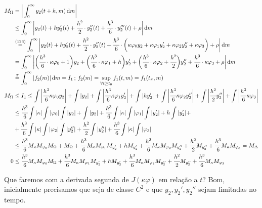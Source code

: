 \documentclass[12pt]{article}
\begin{document}
\begin{align}
M_{\Omega} &= \bigg| \int_0^{\infty} y_2(t + h, m)\,\mathrm{d}m \bigg| \\
&\le \int_0^{\infty} \bigg| y_2(t) + h y_2'(t) + \cfrac{h^2}{2}\cdot y_2''(t) + \cfrac{h^3}{6}\cdot y_2'''(t) + \rho \bigg| \,\mathrm{d}m \\
&\stackrel{(126)}{=} \int_0^{\infty} \bigg| y_2(t) + h y_2'(t) + \cfrac{h^2}{2}\cdot y_2''(t) + \cfrac{h^3}{6}\cdot \bigg( \kappa \varphi_0 y_2 + \kappa \varphi_1 y'_2 + \kappa \varphi_2 y_2'' + \kappa \varphi_3 \bigg) + \rho \bigg| \,\mathrm{d}m \\
&= \int_0^{\infty} \bigg| \bigg(\cfrac{h^3}{6}\cdot \kappa \varphi_0 + 1 \bigg) y_2 + \bigg(\cfrac{h^3}{6}\cdot \kappa \varphi_1  + h \bigg) y'_2 + \bigg( \cfrac{h^3}{6}\cdot \kappa \varphi_2 + \cfrac{h^2}{2} \bigg) y_2'' + \cfrac{h^3}{6}\cdot \kappa \varphi_3 + \rho \bigg| \,\mathrm{d}m \\
&\stackrel{\pi}{=} \int_0^{\infty} | f_2(m) | \,\mathrm{d}m = I_1\,;\,f_2(m) = \sup_{\forall t \ge t_0} f_1(t, m) = f_1(t_{\pi}, m) \\
M_{\Omega} &\le I_1 \le \int \bigg| \cfrac{h^3}{6} \kappa \varphi_0 y_2 \bigg| + \int | y_2 | + \int \bigg| \cfrac{h^3}{6} \kappa \varphi_1 y_2' \bigg| + \int | h y_2' | + \int \bigg| \cfrac{h^3}{6} \kappa \varphi_2 y_2'' \bigg| + \int \bigg| \cfrac{h^2}{2} y_2'' \bigg| + \int \bigg|  \cfrac{h^3}{6} \kappa \varphi_3 \bigg|  \\
&\le \cfrac{h^3}{6} \int | \kappa | \int |\varphi_0| \int |y_2 | + \int | y_2 | + \cfrac{h^3}{6} \int | \kappa| \int | \varphi_1 | \int | y_2' | + h \int | y_2' | + \nonumber \\
&+ \cfrac{h^3}{6} \int | \kappa| \int | \varphi_2 | \int | y_2'' |+ \cfrac{h^2}{2} \int | y_2'' | + \cfrac{h^3}{6} \int | \kappa| \int | \varphi_3 |  \\
&\le \cfrac{h^3}{6} M_{\kappa} M_{\varphi_0} M_{\Omega} + M_{\Omega} + \cfrac{h^3}{6} M_{\kappa} M_{\varphi_1} M_{y_2'} + h M_{y_2'} +  \cfrac{h^3}{6} M_{\kappa} M_{\varphi_2} M_{y_2''} + \cfrac{h^2}{2} M_{y_2''} + \cfrac{h^3}{6} M_{\kappa} M_{\varphi_3} = M_{\Delta}  \\
0 &\le \cfrac{h^3}{6} M_{\kappa} M_{\varphi_0} M_{\Omega} + \cfrac{h^3}{6} M_{\kappa} M_{\varphi_1} M_{y_2'} + h M_{y_2'} +  \cfrac{h^3}{6} M_{\kappa} M_{\varphi_2} M_{y_2''} + \cfrac{h^2}{2} M_{y_2''} + \cfrac{h^3}{6} M_{\kappa} M_{\varphi_3}
\end{align}

Que faremos com a derivada segunda de $J(\kappa \varphi)$ em rela\c{c}\~ao a $t$? Bom, inicialmente precisamos que seja de classe $C^2$ e que $y_2, y_2', y_2''$ sejam limitadas no tempo.
\end{document}
